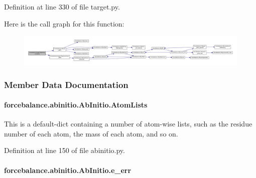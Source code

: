 Definition at line 330 of file target.\-py.



Here is the call graph for this function\-:\nopagebreak
\begin{figure}[H]
\begin{center}
\leavevmode
\includegraphics[width=350pt]{classforcebalance_1_1target_1_1Target_af6099ec09486213869dba2491bd8ea04_cgraph}
\end{center}
\end{figure}




\subsubsection{Member Data Documentation}
\hypertarget{classforcebalance_1_1abinitio_1_1AbInitio_a7e62a74e820ac0c5dd67f49155b95c41}{
\paragraph[{Atom\-Lists}]{\setlength{\rightskip}{0pt plus 5cm}forcebalance.\-abinitio.\-Ab\-Initio.\-Atom\-Lists\hspace{0.3cm}{\ttfamily [inherited]}}}\label{classforcebalance_1_1abinitio_1_1AbInitio_a7e62a74e820ac0c5dd67f49155b95c41}


This is a default-\/dict containing a number of atom-\/wise lists, such as the residue number of each atom, the mass of each atom, and so on. 



Definition at line 150 of file abinitio.\-py.

\hypertarget{classforcebalance_1_1abinitio_1_1AbInitio_aa569290969858e189935b3de37ead3f0}{
\paragraph[{e\-\_\-err}]{\setlength{\rightskip}{0pt plus 5cm}forcebalance.\-abinitio.\-Ab\-Initio.\-e\-\_\-err\hspace{0.3cm}{\ttfamily [inherited]}}}\label{classforcebalance_1_1abinitio_1_1AbInitio_aa569290969858e189935b3de37ead3f0}


